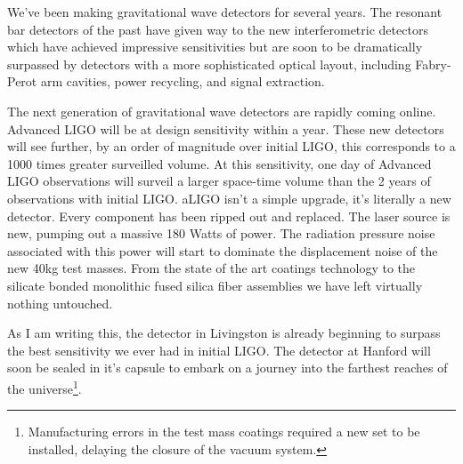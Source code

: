 

%

We've been making gravitational wave detectors for several years.
The resonant bar detectors of the past have given way to the new
interferometric detectors which have achieved impressive sensitivities
but are soon to be dramatically surpassed
by detectors with a more sophisticated optical layout, including Fabry-Perot
arm cavities, power recycling, and signal extraction.


The next generation of gravitational wave detectors are rapidly coming
online.
Advanced LIGO will be at design sensitivity within a year.
These new detectors will see further, by an order of magnitude over
initial LIGO, this corresponds to a 1000 times greater surveilled volume.
At this sensitivity, one day of Advanced LIGO observations will surveil a
larger space-time volume than the 2 years of observations with initial LIGO.
aLIGO isn't a simple upgrade, it's literally a new detector.
Every component has been ripped out and replaced.
The laser source is new, pumping out a massive
180 Watts of power.
The radiation pressure noise associated with this power will start to
dominate the displacement noise of the new 40kg test masses.
From the state of the art coatings technology to the silicate bonded
monolithic fused silica fiber assemblies we have left virtually
nothing untouched.

As I am writing this,
the detector in Livingston is already beginning to surpass the
best sensitivity we ever had in initial LIGO. The detector at Hanford will
soon be sealed in it's capsule to embark on a journey into the farthest
reaches of the
universe\footnote{Manufacturing errors in the test mass coatings required a new
set to be installed, delaying the closure of the vacuum system.}.

